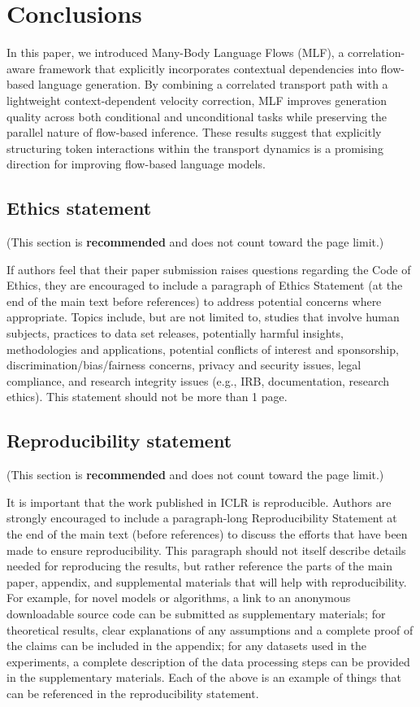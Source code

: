 \documentclass{article} %
\begin{document}
\section{Conclusions}
\label{sec:conclusion}
In this paper, we introduced Many-Body Language Flows (MLF), a correlation-aware framework that explicitly incorporates contextual dependencies into flow-based language generation. By combining a correlated transport path with a lightweight context-dependent velocity correction, MLF improves generation quality across both conditional and unconditional tasks while preserving the parallel nature of flow-based inference. These results suggest that explicitly structuring token interactions within the transport dynamics is a promising direction for improving flow-based language models.




\subsection*{Ethics statement}

(This section is \textbf{recommended} and does not count toward the page limit.)

If authors feel that their paper submission raises questions regarding the Code
of Ethics, they are encouraged to include a paragraph of Ethics Statement (at
the end of the main text before references) to address potential concerns where
appropriate. Topics include, but are not limited to, studies that involve human
subjects, practices to data set releases, potentially harmful insights,
methodologies and applications, potential conflicts of interest and sponsorship,
discrimination/bias/fairness concerns, privacy and security issues, legal
compliance, and research integrity issues (e.g., IRB, documentation, research
ethics). This statement should not be more than 1 page.

\subsection*{Reproducibility statement}

(This section is \textbf{recommended} and does not count toward the page limit.)

It is important that the work published in ICLR is reproducible. Authors are
strongly encouraged to include a paragraph-long Reproducibility Statement at the
end of the main text (before references) to discuss the efforts that have been
made to ensure reproducibility. This paragraph should not itself describe
details needed for reproducing the results, but rather reference the parts of
the main paper, appendix, and supplemental materials that will help with
reproducibility. For example, for novel models or algorithms, a link to an
anonymous downloadable source code can be submitted as supplementary materials;
for theoretical results, clear explanations of any assumptions and a complete
proof of the claims can be included in the appendix; for any datasets used in
the experiments, a complete description of the data processing steps can be
provided in the supplementary materials. Each of the above is an example of
things that can be referenced in the reproducibility statement.
\end{document}
